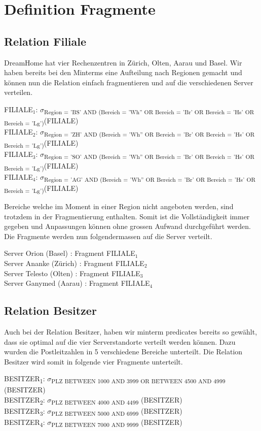 \documentclass[11pt,a4paper,parskip=half]{scrartcl}
\begin{document}
\section{Definition Fragmente}
\subsection{Relation Filiale}
DreamHome hat vier Rechenzentren in Zürich, Olten, Aarau und Basel. Wir haben bereits bei den Minterms eine Aufteilung nach Regionen gemacht und können nun die Relation einfach fragmentieren und auf die verschiedenen Server verteilen. 

FILIALE$_1$: $\sigma$\textsubscript{Region = 'BS' AND (Bereich = 'Wh'' OR Bereich = 'Br' OR Bereich = 'Hs' OR Bereich = 'Lg')}(FILIALE)\\
FILIALE$_2$: $\sigma$\textsubscript{Region = 'ZH' AND (Bereich = 'Wh'' OR Bereich = 'Br' OR Bereich = 'Hs' OR Bereich = 'Lg')}(FILIALE)\\
FILIALE$_3$: $\sigma$\textsubscript{Region = 'SO' AND (Bereich = 'Wh'' OR Bereich = 'Br' OR Bereich = 'Hs' OR Bereich = 'Lg')}(FILIALE)\\
FILIALE$_4$: $\sigma$\textsubscript{Region = 'AG' AND (Bereich = 'Wh'' OR Bereich = 'Br' OR Bereich = 'Hs' OR Bereich = 'Lg')}(FILIALE)

Bereiche welche im Moment in einer Region nicht angeboten werden, sind trotzdem in der Fragmentierung enthalten. Somit ist die Vollständigkeit immer gegeben und Anpassungen können ohne grossen Aufwand durchgeführt werden. Die Fragmente werden nun folgendermassen auf die Server verteilt.

Server Orion (Basel) : Fragment FILIALE$_1$\\
Server Ananke (Zürich) : Fragment FILIALE$_2$\\
Server Telesto (Olten) : Fragment FILIALE$_3$\\
Server Ganymed (Aarau) : Fragment FILIALE$_4$

\subsection{Relation Besitzer}
Auch bei der Relation Besitzer, haben wir minterm predicates bereits so gewählt, dass sie optimal auf die vier Serverstandorte verteilt werden können. Dazu wurden die Postleitzahlen in 5 verschiedene Bereiche unterteilt. Die Relation Besitzer wird somit in folgende vier Fragmente unterteilt.

BESITZER\textsubscript{1}: $\sigma$\textsubscript{PLZ  BETWEEN 1000 AND 3999 OR BETWEEN 4500 AND 4999} (BESITZER)\\
BESITZER\textsubscript{2}: $\sigma$\textsubscript{PLZ  BETWEEN 4000 AND 4499} (BESITZER)\\
BESITZER\textsubscript{3}: $\sigma$\textsubscript{PLZ  BETWEEN 5000 AND 6999} (BESITZER)\\
BESITZER\textsubscript{4}: $\sigma$\textsubscript{PLZ  BETWEEN 7000 AND 9999} (BESITZER)
\end{document}
